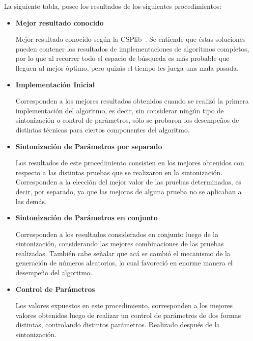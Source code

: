 
La siguiente tabla, posee los resultados de los siguientes procedimientos:
\begin{itemize}
	\item \textbf{Mejor resultado conocido}

		Mejor resultado conocido según la CSPlib~\cite{CSP}.
		Se entiende que éstas soluciones pueden contener los resultados de implementaciones de algoritmos completos,
		por lo que al recorrer todo el espacio de búsqueda es más probable que lleguen al mejor óptimo,
		pero quizás el tiempo les juega una mala pasada.

	\item \textbf{Implementación Inicial}

		Corresponden a los mejores resultados obtenidos cuando se realizó la primera implementación del algoritmo,
		es decir, sin considerar ningún tipo de sintonización o control de parámetros, sólo se probaron
		los desempeños de distintas técnicas para ciertos componentes del algoritmo.

	\item \textbf{Sintonización de Parámetros por separado}

		Los resultados de este procedimiento consisten en los mejores obtenidos con respecto a las distintas pruebas
		que se realizaron en la sintonización. Corresponden a la elección del mejor valor de las pruebas determinadas,
		es decir, por separado, ya que las mejoras de alguna prueba no se aplicaban a las demás.

	\item \textbf{Sintonización de Parámetros en conjunto}

		Corresponden a los resultados considerados en conjunto luego de la sintonización, considerando las mejores
		combinaciones de las pruebas realizadas. También cabe señalar que acá se cambió el mecanismo de la generación
		de números aleatorios, lo cual favoreció en enorme manera el desempeño del algoritmo.

	\item \textbf{Control de Parámetros}

		Los valores expuestos en este procedimiento, corresponden a los mejores valores obtenidos luego de realizar
		un control de parámetros de dos formas distintas, controlando distintos parámetros. Realizado después de la sintonización.
\end{itemize}


